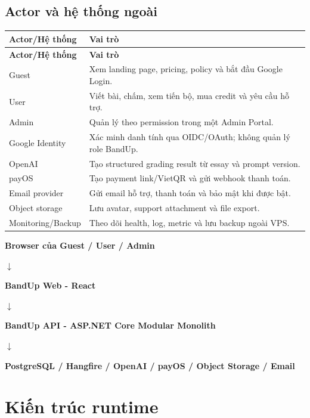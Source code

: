 \documentclass[11pt,a4paper]{article}
\newcommand{\flowarrow}{\par\centering\sffamily\color{BandBlue}\Large$\downarrow$\par}
\newcommand{\flowstep}[1]{\par\centering\sffamily\bfseries #1\par}
\begin{document}
\subsection{Actor và hệ thống ngoài}
\begin{longtable}{|P{0.25\textwidth}|P{0.65\textwidth}|}
\hline
\textbf{Actor/Hệ thống} & \textbf{Vai trò} \\ \hline
\endfirsthead
\hline
\textbf{Actor/Hệ thống} & \textbf{Vai trò} \\ \hline
\endhead
Guest & Xem landing page, pricing, policy và bắt đầu Google Login. \\ \hline
User & Viết bài, chấm, xem tiến bộ, mua credit và yêu cầu hỗ trợ. \\ \hline
Admin & Quản lý theo permission trong một Admin Portal. \\ \hline
Google Identity & Xác minh danh tính qua OIDC/OAuth; không quản lý role BandUp. \\ \hline
OpenAI & Tạo structured grading result từ essay và prompt version. \\ \hline
payOS & Tạo payment link/VietQR và gửi webhook thanh toán. \\ \hline
Email provider & Gửi email hỗ trợ, thanh toán và bảo mật khi được bật. \\ \hline
Object storage & Lưu avatar, support attachment và file export. \\ \hline
Monitoring/Backup & Theo dõi health, log, metric và lưu backup ngoài VPS. \\ \hline
\end{longtable}

\begin{architecturebox}
\flowstep{Browser của Guest / User / Admin}
\flowarrow
\flowstep{BandUp Web - React}
\flowarrow
\flowstep{BandUp API - ASP.NET Core Modular Monolith}
\flowarrow
\flowstep{PostgreSQL / Hangfire / OpenAI / payOS / Object Storage / Email}
\end{architecturebox}

\section{Kiến trúc runtime}
\end{document}
